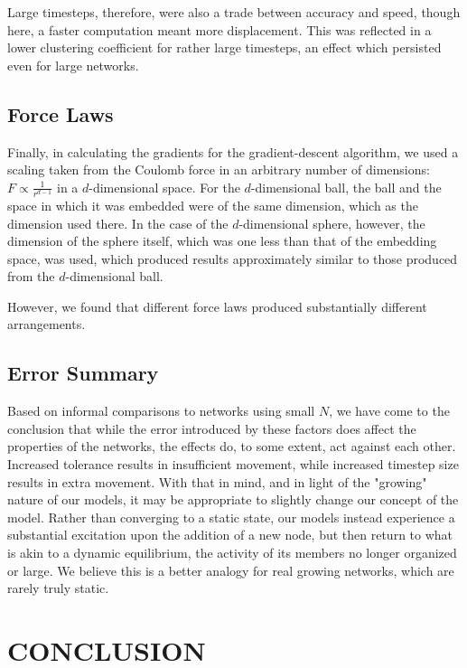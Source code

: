 \documentclass[aps,pre,reprint,superscriptaddress,amsmath,amssymb,nofootinbib]{revtex4-1}
\begin{document}
Large timesteps, therefore, were also a trade between accuracy and speed, though here, a faster computation meant more displacement.  
This was reflected in a lower clustering coefficient for rather large timesteps, an effect which persisted even for large networks.

\subsection{Force Laws}
Finally, in calculating the gradients for the gradient-descent algorithm, we used a scaling taken from the Coulomb force in an arbitrary number of dimensions: $F \propto \frac{1}{r^{d-1}}$ in a $d$-dimensional space.  
For the $d$-dimensional ball, the ball and the space in which it was embedded were of the same dimension, which as the dimension used there.  
In the case of the $d$-dimensional sphere, however, the dimension of the sphere itself, which was one less than that of the embedding space, was used, which produced results approximately similar to those produced from the $d$-dimensional ball.

However, we found that different force laws produced substantially different arrangements.  %

\subsection{Error Summary}
Based on informal comparisons to networks using small $N$, we have come to the conclusion that while the error introduced by these factors does affect the properties of the networks, the effects do, to some extent, act against each other.  Increased tolerance results in insufficient movement, while increased timestep size results in extra movement.  With that in mind, and in light of the "growing" nature of our models, it may be appropriate to slightly change our concept of the model.  Rather than converging to a static state, our models instead experience a substantial excitation upon the addition of a new node, but then return to what is akin to a dynamic equilibrium, the activity of its members no longer organized or large.  We believe this is a better analogy for real growing networks, which are rarely truly static.

\section{CONCLUSION}


\end{document}

